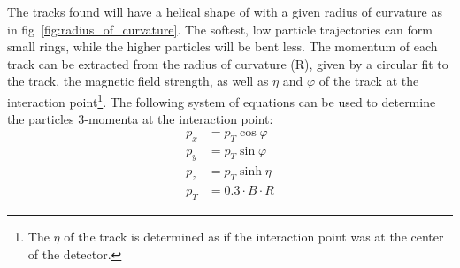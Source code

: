 The tracks found will have a helical shape of with a given radius of curvature as in fig~\ref{fig:radius_of_curvature}.
The softest, low \pt particle trajectories can form small rings, while the higher \pt particles will be bent less.
The momentum of each track can be extracted from the radius of curvature (R), given by a circular fit to the track, the magnetic field strength, as well as $\eta$ and $\varphi$ of the track at the interaction point\footnote{The $\eta$ of the track is determined as if the interaction point was at the center of the detector.}.
The following system of equations can be used to determine the particles 3-momenta at the interaction point:
\begin{equation}
	\begin{aligned}
		p_{x}&=p_{T}\cos\varphi\\
		p_{y}&=p_{T}\sin\varphi\\
		p_{z}&=p_{T}\sinh\eta\\
		p_{T}&=0.3\cdot{B}\cdot{R}
	\end{aligned}
\end{equation}

